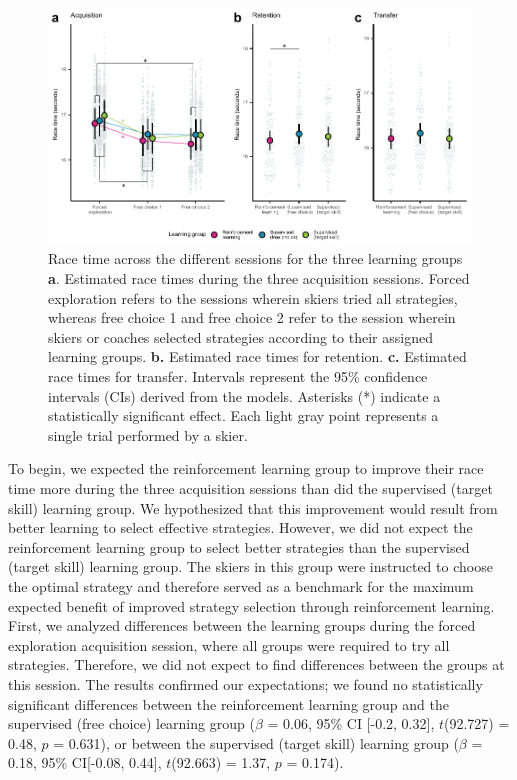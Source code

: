 \begin{figure}
    \centering
    \includegraphics[width=1\linewidth]{figure/figure_racingtimes_2.pdf}
    \caption{Race time across the different sessions for the three learning groups \textbf{a}. Estimated race times during the three acquisition sessions. Forced exploration refers to the sessions wherein skiers tried all strategies, whereas free choice 1 and free choice 2 refer to the session wherein skiers or coaches selected strategies according to their assigned learning groups. \textbf{b.} Estimated race times for retention. \textbf{c.} Estimated race times for transfer. Intervals represent the 95\% confidence intervals (CIs) derived from the models. Asterisks (*) indicate a statistically significant effect. Each light gray point represents a single trial performed by a skier.}
    \label{fig:rlstudy_racetime}
\end{figure}

To begin, we expected the reinforcement learning group to improve their race time more during the three acquisition sessions than did the supervised (target skill) learning group. We hypothesized that this improvement would result from better learning to select effective strategies. However, we did not expect the reinforcement learning group to select better strategies than the supervised (target skill) learning group. The skiers in this group were instructed to choose the optimal strategy and therefore served as a benchmark for the maximum expected benefit of improved strategy selection through reinforcement learning. First, we analyzed differences between the learning groups during the forced exploration acquisition session, where all groups were required to try all strategies. Therefore, we did not expect to find differences between the groups at this session. The results confirmed our expectations; we found no statistically significant differences between the reinforcement learning group and the supervised (free choice) learning group ($\beta$ = 0.06, 95\% CI [-0.2, 0.32], $t$(92.727) = 0.48, $p$ = 0.631), or between the supervised (target skill) learning group  ($\beta$ = 0.18, 95\% CI[-0.08, 0.44], $t$(92.663) = 1.37, $p$ = 0.174).  

